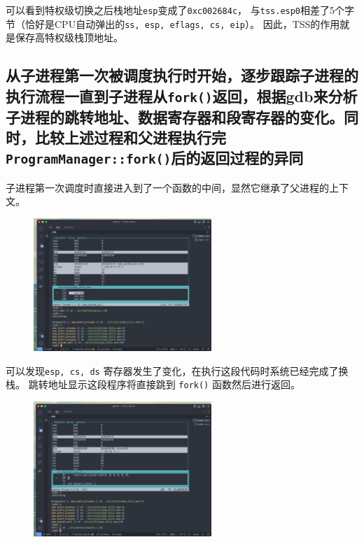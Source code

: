 可以看到特权级切换之后栈地址\texttt{esp}变成了\texttt{0xc002684c}，
与\texttt{tss.esp0}相差了5个字节（恰好是CPU自动弹出的\texttt{ss, esp, eflags, cs, eip}）。
因此，TSS的作用就是保存高特权级栈顶地址。

\subsection{从子进程第一次被调度执行时开始，逐步跟踪子进程的执行流程一直到子进程从\texttt{fork()}返回，根据gdb来分析子进程的跳转地址、数据寄存器和段寄存器的变化。同时，比较上述过程和父进程执行完\texttt{ProgramManager::fork()}后的返回过程的异同}

子进程第一次调度时直接进入到了一个函数的中间，显然它继承了父进程的上下文。

\begin{figure}[H]
    \centering
    \includegraphics[width=0.6\textwidth]{figures/sub0.png}
    \label{sub0}
\end{figure}

可以发现\texttt{esp, cs, ds} 寄存器发生了变化，在执行这段代码时系统已经完成了换栈。
跳转地址显示这段程序将直接跳到 \texttt{fork()} 函数然后进行返回。

\begin{figure}[H]
    \centering
    \includegraphics[width=0.6\textwidth]{figures/sub1.png}
    \label{sub1}
\end{figure}

